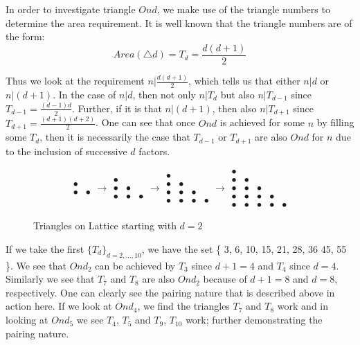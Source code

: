 \documentclass[11pt,reqno]{amsart}
\theoremstyle{mydef}
\begin{document}
In order to investigate triangle $Ond$, we make use of the triangle numbers \cite{TriangleNumbers}
to determine the area requirement. It is well known that the triangle numbers are of the form:
\[
	Area(\triangle d) =  T_d =  \frac{d(d+1)}{2}
\]

Thus we look at the requirement $n \vert \frac{d(d+1)}{2}$, which tells us that either $n \vert d$ or $n \vert (d+1)$.
In the case of $n \vert d$, then not only $n \vert T_d$ but also $n \vert T_{d-1}$ since $T_{d-1} = \frac{(d-1)d}{2}$.
Further, if it is that $n \vert (d+1)$, then also $n \vert T_{d+1}$ since $T_{d+1} = \frac{(d+1)(d +2)}{2}$. One can see that 
once $Ond$ is achieved for some $n$ by filling some $T_d$, then it is necessarily the case that $T_{d-1}$ or $T_{d+1}$
are also $Ond$ for $n$ due to the inclusion of successive $d$ factors.

\begin{figure}[h]
\[  \begin{array}{cc}
\bullet & \ \\
\bullet & \bullet
\end{array} 
\rightarrow
%
\begin{array}{ccc}
\bullet & \  & \ \\
\bullet & \bullet \\
\bullet & \bullet & \bullet 
\end{array}
\rightarrow
\begin{array}{cccc}
\bullet & \  & \  & \  \\
\bullet & \bullet & \  & \  \\
\bullet & \bullet & \bullet & \  \\
\bullet & \bullet & \bullet & \bullet
\end{array}
\rightarrow
\begin{array}{ccccc}
\bullet & \  & \  & \  & \  \\
\bullet & \bullet & \   & \  & \  \\
\bullet & \bullet & \bullet  & \ & \  \\
\bullet & \bullet & \bullet & \bullet & \  \\
\bullet & \bullet & \bullet & \bullet & \bullet
\end{array}
\]
\caption{Triangles on Lattice starting with $d = 2$}
\label{fig:trianglegrowth}
\end{figure}

If we take the first $ \{T_d\}_{d=2,\ldots,10}$, we have the set \{ 3, 6, 10, 15, 21, 28, 36
45, 55 \}. We see that $Ond_2$ can be achieved by $T_3$ since $d +1 = 4$ and
$T_4$ since $d = 4$. Similarly we see that $T_7$ and $T_8$ are also $Ond_2$ because
of $d + 1 = 8$ and $d = 8$, respectively. One can clearly see the pairing nature that is described
above in action here. If we look at $Ond_4$, we find the triangles $T_7$ and $T_8$ work and
in looking at $Ond_5$ we see $T_4$, $T_5$ and $T_9$, $T_{10}$ work; further demonstrating
the pairing nature.
\end{document}
